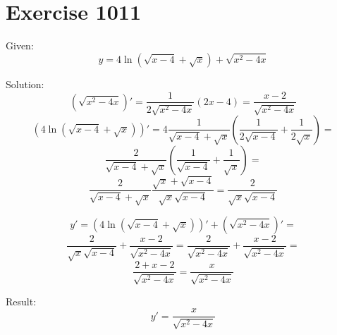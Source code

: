\documentclass[a4paper, 10pt]{scrartcl}
\begin{document}
\section{Exercise 1011}

Given:
\[
y = 4\ln{(\sqrt{x - 4} + \sqrt{x})} + \sqrt{x^{2} - 4x}
\]

Solution:
\[
(\sqrt{x^{2} - 4x})' = \frac{1}{2\sqrt{x^{2} - 4x}}(2x - 4) = \frac{x - 2}{\sqrt{x^{2} - 4x}}
\]
\[
(4\ln{(\sqrt{x - 4} + \sqrt{x})})' = 4\frac{1}{\sqrt{x - 4} + \sqrt{x}}\left(\frac{1}{2\sqrt{x - 4}} + \frac{1}{2\sqrt{x}}\right) =
\]
\[
\frac{2}{\sqrt{x - 4} + \sqrt{x}}\left(\frac{1}{\sqrt{x - 4}} + \frac{1}{\sqrt{x}}\right) =
\]
\[
\frac{2}{\sqrt{x - 4} + \sqrt{x}}\frac{\sqrt{x} + \sqrt{x - 4}}{\sqrt{x}\sqrt{x - 4}} = \frac{2}{\sqrt{x}\sqrt{x - 4}}
\]

\[
y' = (4\ln{(\sqrt{x - 4} + \sqrt{x})})' + (\sqrt{x^{2} - 4x})' =
\]
\[
\frac{2}{\sqrt{x}\sqrt{x - 4}} + \frac{x - 2}{\sqrt{x^{2} - 4x}} = \frac{2}{\sqrt{x^{2} - 4x}} + \frac{x - 2}{\sqrt{x^{2} - 4x}} = 
\]
\[
\frac{2 + x - 2}{\sqrt{x^{2} - 4x}} = \frac{x}{\sqrt{x^{2} - 4x}}
\]

Result:
\[
y' = \frac{x}{\sqrt{x^{2} - 4x}}
\]
\end{document}
